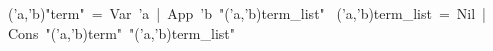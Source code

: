 \begin{isabelle}%
~('a,'b){"}term{"}~=~Var~'a~|~App~'b~{"}('a,'b)term\_list{"}\isanewline
{}~('a,'b)term\_list~=~Nil~|~Cons~{"}('a,'b)term{"}~{"}('a,'b)term\_list{"}\end{isabelle}%
